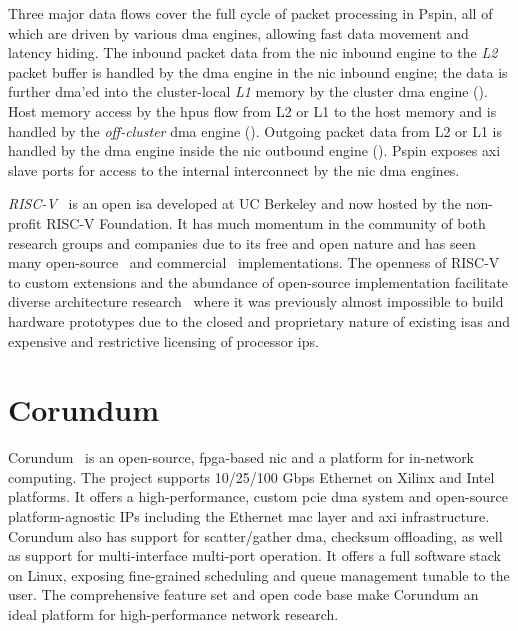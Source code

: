 Three major data flows cover the full cycle of packet processing in P\acs{spin}, all of which are driven by various \ac{dma} engines, allowing fast data movement and latency hiding.  The inbound packet data from the \ac{nic} inbound engine to the \emph{L2} packet buffer is handled by the \ac{dma} engine in the \ac{nic} inbound engine; the data is further \ac{dma}'ed into the cluster-local \emph{L1} memory by the cluster \ac{dma} engine ().  Host memory access by the \ac{hpu}s flow from L2 or L1 to the host memory and is handled by the \emph{off-cluster} \ac{dma} engine ().  Outgoing packet data from L2 or L1 is handled by the \ac{dma} engine inside the \ac{nic} outbound engine ().  P\acs{spin} exposes \ac{axi} slave ports for access to the internal interconnect by the \ac{nic} \ac{dma} engines.

\emph{RISC-V}~\cite{asanovic_instruction_2014, waterman_risc-v_2019} is an open \ac{isa} developed at UC Berkeley and now hosted by the non-profit RISC-V Foundation.  It has much momentum in the community of both research groups and companies due to its free and open nature and has seen many open-source~\cite{zhao_sonicboom_2020, asanovic_rocket_2016, rossi_pulp_2015} and commercial~\cite{t-head_t-head_nodate,sifive_sifive_2022} implementations.  The openness of RISC-V to custom extensions and the abundance of open-source implementation facilitate diverse architecture research~\cite{lee_keystone_2020, shao_simba_2019, genc_gemmini_2019, lin_panic_2020, khazraee_rosebud_2023} where it was previously almost impossible to build hardware prototypes due to the closed and proprietary nature of existing \ac{isa}s and expensive and restrictive licensing of processor \ac{ip}s.

\section{Corundum} \label{sec:background-corundum}

Corundum~\cite{forencich_corundum_2020} is an open-source, \ac{fpga}-based \ac{nic} and a platform for in-network computing.  The project supports 10/25/100 Gbps Ethernet on Xilinx and Intel platforms.  It offers a high-performance, custom \ac{pcie} \ac{dma} system and open-source platform-agnostic IPs including the Ethernet \ac{mac} layer and \ac{axi} infrastructure.  Corundum also has support for scatter/gather \ac{dma}, checksum offloading, as well as support for multi-interface multi-port operation.  It offers a full software stack on Linux, exposing fine-grained scheduling and queue management tunable to the user.  The comprehensive feature set and open code base make Corundum an ideal platform for high-performance network research.


